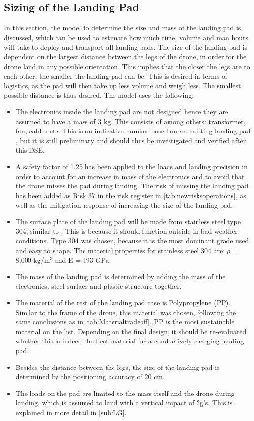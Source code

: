 \subsection{Sizing of the Landing Pad}\label{sub:landingpad}
In this section, the model to determine the size and mass of the landing pad is discussed, which can be used to estimate how much time, volume and man hours will take to deploy and transport all landing pads. The size of the landing pad is dependent on the largest distance between the legs of the drone, in order for the drone land in any possible orientation. This implies that the closer the legs are to each other, the smaller the landing pad can be. This is desired in terms of logistics, as the pad will then take up less volume and weigh less. The smallest possible distance is thus desired. The model uses the following:
\begin{itemize}[nolistsep,noitemsep]
    \item The electronics inside the landing pad are not designed hence they are assumed to have a mass of 3 kg. This consists of among others: transformer, fan, cables etc.
    This is an indicative number based on an existing landing pad \cite{skycharge}, but it is still preliminary and should thus be investigated and verified after this DSE.
    \item A safety factor of 1.25 has been applied to the loads and landing precision in order to account for an increase in mass of the electronics and to avoid that the drone misses the pad during landing. The risk of missing the landing pad has been added as Risk 37 in the risk register in \autoref{tab:newrisksoperations}, as well as the mitigation response of increasing the size of the landing pad.
    \item The surface plate of the landing pad will be made from stainless steel type 304, similar to \cite{skycharge}. This is because it should function outside in bad weather conditions. Type 304 was chosen, because it is the most dominant grade used and easy to shape. The material properties for stainless steel 304 are: $\rho$ = 8,000 kg/m$^3$ and E = 193 GPa. \cite{stainlesssteel304}
    \item The mass of the landing pad is determined by adding the mass of the electronics, steel surface and plastic structure together.
    \item The material of the rest of the landing pad case is Polypropylene (PP). Similar to the frame of the drone, this material was chosen, following the same conclusions as in \autoref{tab:Materialtradeoff}. PP is the most sustainable material on the list. Depending on the final design, it should be re-evaluated whether this is indeed the best material for a conductively charging landing pad.
    \item Besides the distance between the legs, the size of the landing pad is determined by the positioning accuracy of 20 cm.  
    \item The loads on the pad are limited to the mass itself and the drone during landing, which is assumed to land with a vertical impact of 2g's. This is explained in more detail in \autoref{sub:LG}.
\end{itemize}

